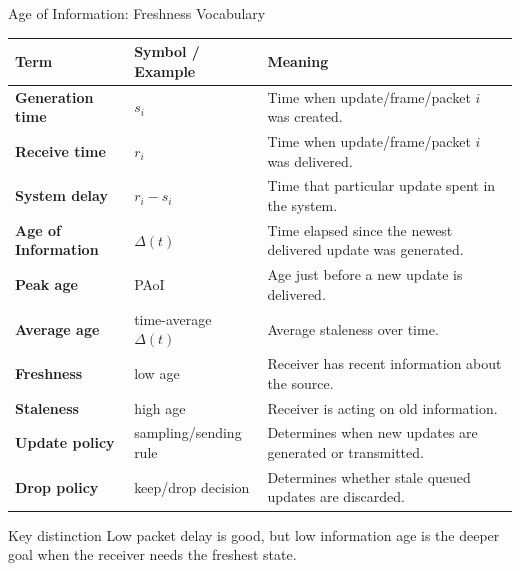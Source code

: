 \documentclass[aspectratio=169]{beamer}
\begin{document}
\begin{frame}{Age of Information: Freshness Vocabulary}
\scriptsize

\begin{tabular}{p{2.6cm} p{2.9cm} p{6.4cm}}
\toprule
\textbf{Term} & \textbf{Symbol / Example} & \textbf{Meaning} \\
\midrule
\textbf{Generation time} & $s_i$ & Time when update/frame/packet $i$ was created. \\
\textbf{Receive time} & $r_i$ & Time when update/frame/packet $i$ was delivered. \\
\textbf{System delay} & $r_i - s_i$ & Time that particular update spent in the system. \\
\textbf{Age of Information} & $\Delta(t)$ & Time elapsed since the newest delivered update was generated. \\
\textbf{Peak age} & PAoI & Age just before a new update is delivered. \\
\textbf{Average age} & time-average $\Delta(t)$ & Average staleness over time. \\
\textbf{Freshness} & low age & Receiver has recent information about the source. \\
\textbf{Staleness} & high age & Receiver is acting on old information. \\
\textbf{Update policy} & sampling/sending rule & Determines when new updates are generated or transmitted. \\
\textbf{Drop policy} & keep/drop decision & Determines whether stale queued updates are discarded. \\
\bottomrule
\end{tabular}

\vspace{0.15cm}

\begin{alertblock}{Key distinction}
Low packet delay is good, but low information age is the deeper goal when the receiver needs the freshest state.
\end{alertblock}

\end{frame}
\end{document}
